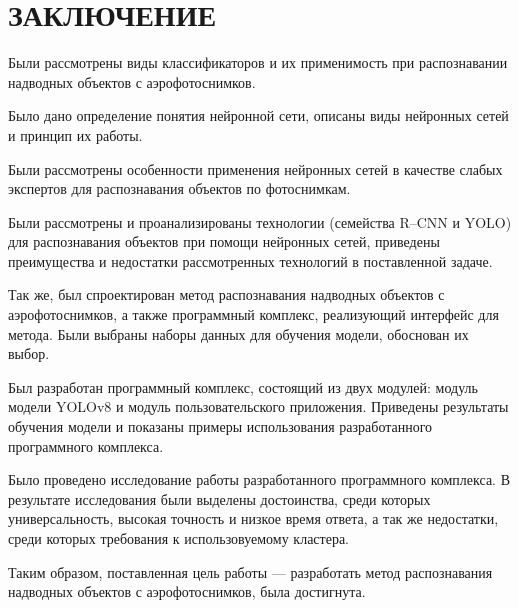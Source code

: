 \chapter*{ЗАКЛЮЧЕНИЕ}

Были рассмотрены виды классификаторов и их применимость при распознавании надводных объектов с аэрофотоснимков.

Было дано определение понятия нейронной сети, описаны виды нейронных сетей и принцип их работы.

Были рассмотрены особенности применения нейронных сетей в качестве слабых экспертов для распознавания объектов по фотоснимкам.

Были рассмотрены и проанализированы технологии (семейства R–CNN и YOLO) для распознавания объектов при помощи нейронных сетей, приведены преимущества и недостатки рассмотренных технологий в поставленной задаче.

Так же, был спроектирован метод распознавания надводных объектов с аэрофотоснимков, а также программный комплекс, реализующий интерфейс для метода. Были выбраны наборы данных для обучения модели, обоснован их выбор.

Был разработан программный комплекс, состоящий из двух модулей: модуль модели YOLOv8 и модуль пользовательского приложения. Приведены результаты обучения модели и показаны примеры использования разработанного программного комплекса.

Было проведено исследование работы разработанного программного комплекса. В результате исследования были выделены достоинства, среди которых универсальность, высокая точность и низкое время ответа, а так же недостатки, среди которых требования к использовуемому кластера.

Таким образом, поставленная цель работы --- разработать метод распознавания надводных объектов с аэрофотоснимков, была достигнута.